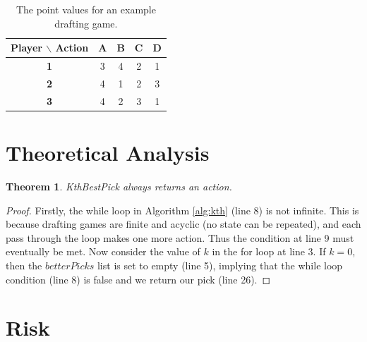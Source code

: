 \documentclass[letterpaper]{article}
\newtheorem{theorem}{Theorem}[section]
\numberwithin{equation}{section}
\numberwithin{theorem}{section}
\numberwithin{lemma}{section}
\numberwithin{df}{section}
\begin{document}
\begin{table}[t]
	\begin{center}
		\caption{The point values for an example drafting game.}
		\label{tab:KthEx}
		\begin{footnotesize}
		\begin{tabular}{|c|c|c|c|c|}
			\hline
			\bf Player $\backslash$ Action & \bf A & \bf B & \bf C & \bf D \\
			\hline
			\bf 1 & 3 & 4 & 2 & 1 \\
			\hline
			\bf 2 & 4 & 1 & 2 & 3 \\
			\hline
			\bf 3 & 4 & 2 & 3 & 1 \\
			\hline
		\end{tabular}
		\end{footnotesize}
	\end{center}
\end{table}

\section{Theoretical Analysis}

\begin{theorem}
	\label{thm:Kth}
	KthBestPick always returns an action.
\end{theorem}
\begin{proof}
Firstly, the while loop in Algorithm \ref{alg:kth} (line 8) is not infinite.  This is because drafting games are finite and acyclic (no state can be repeated), and each pass through the loop makes one more action.  Thus the condition at line 9 must eventually be met.  Now consider the value of $k$ in the for loop at line 3.  If $k = 0$, then the $betterPicks$ list is set to empty (line 5), implying that the while loop condition (line 8) is false  and we return our pick (line 26).
\end{proof}

\section{Risk}
\end{document}
